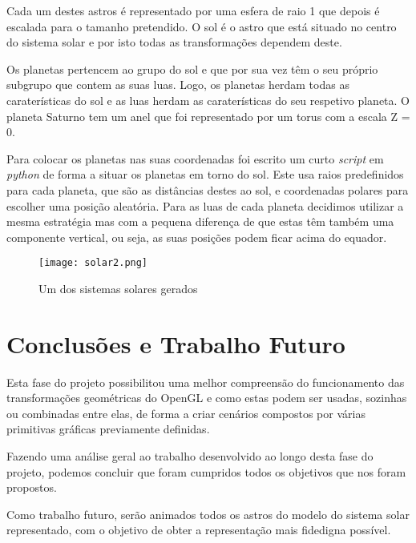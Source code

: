\documentclass[a4paper]{article}
\begin{document}
Cada um destes astros é representado por uma esfera de raio 1 que depois é escalada para o tamanho pretendido. O sol é o astro que está situado no centro do sistema solar e por isto todas as transformações dependem deste.

Os planetas pertencem ao grupo do sol e que por sua vez têm o seu próprio subgrupo que contem as suas luas. Logo, os planetas herdam todas as caraterísticas do sol e as luas herdam as caraterísticas do seu respetivo planeta.
O planeta Saturno tem um anel que foi representado por um torus com a escala Z = 0.

Para colocar os planetas nas suas coordenadas foi escrito um curto \textit{script} em \textit{python} de forma a situar os planetas em torno do sol. Este usa raios predefinidos para cada planeta, que são as distâncias destes ao sol, e coordenadas polares para escolher uma posição aleatória.
Para as luas de cada planeta decidimos utilizar a mesma estratégia mas com a pequena diferença de que estas têm também uma componente vertical, ou seja, as suas posições podem ficar acima do equador.

\begin{figure}[H]
    \centering
    \texttt{[image: solar2.png]}
    \caption{Um dos sistemas solares gerados}
\end{figure}

\section{Conclusões e Trabalho Futuro}
Esta fase do projeto possibilitou uma melhor compreensão do funcionamento das transformações geométricas do OpenGL e como estas podem ser usadas, sozinhas ou combinadas entre elas, de forma a criar cenários compostos por várias primitivas  gráficas previamente definidas.

Fazendo uma análise geral ao trabalho desenvolvido ao longo desta fase do projeto, podemos concluir que foram cumpridos todos os objetivos que nos foram propostos.

Como trabalho futuro, serão animados todos os astros do modelo do sistema solar representado, com o objetivo de obter a representação mais fidedigna possível.
\end{document}
